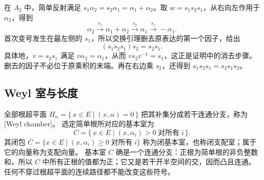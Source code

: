 在 \(A_2\) 中，简单反射满足 \(s_1\alpha_2=s_2\alpha_1=\alpha_1+\alpha_2\)。取 \(w=s_1s_2s_1\)，从右向左作用于 \(\alpha_2\)，得到
\[
	\alpha_2\xrightarrow{s_1}\alpha_1+\alpha_2 \xrightarrow{s_2}\alpha_1\xrightarrow{s_1}-\alpha_1.
\]
首次变号发生在最左侧的 \(s_1\)，所以交换引理删去原表达的第一个因子，给出
\[
	(s_1s_2s_1)s_2=s_2s_1.
\]
具体地，\(v=s_2s_1\) 满足 \(v\alpha_2=\alpha_1\)，从而 \(vs_2v^{-1}=s_1\)，这正是证明中的消去步骤。删去的因子不必位于原乘积的末端。再在右边乘 \(s_2\)，还得到 \(s_1s_2s_1=s_2s_1s_2\)。

\subsection{Weyl 室与长度}
\label{b5:subsec:1701:02}

全部根超平面 \(H_\alpha=\bigl\{\,x\in E\mid(x,\alpha)=0\,\bigr\}\) 把其补集分成若干连通分支，称为[Weyl chamber]。 选定简单根所对应的基本室为
\[
	C=\bigl\{\,x\in E\mid(x,\alpha_i)>0\;\text{对所有}\;i\,\bigr\}.
\]
其闭包 \(\overline C=\{x\in E\mid(x,\alpha_i)\ge0\;\text{对所有}\;i\}\) 称为闭基本室，也称闭支配室；属于它的向量称为支配向量。 基本室 \(C\) 确是一个连通分支：正根为简单根的非负整数和，所以 \(C\) 中所有正根的值都为正；它又是若干开半空间的交，因而凸且连通。任何不穿过根超平面的连续路径都不能改变这些符号。

